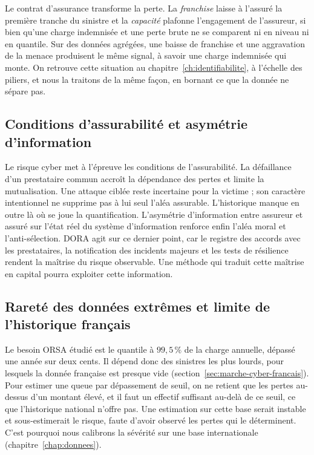 Le contrat d'assurance transforme la perte. La \emph{franchise} laisse à l'assuré la première
tranche du sinistre et la \emph{capacité} plafonne l'engagement de l'assureur, si bien qu'une
charge indemnisée et une perte brute ne se comparent ni en niveau ni en quantile. Sur des données
agrégées, une baisse de franchise et une aggravation de la menace produisent le même signal, à
savoir une charge indemnisée qui monte. On retrouve cette situation au
chapitre~\ref{ch:identifiabilite}, à l'échelle des piliers, et nous la traitons de la
même façon, en bornant ce que la donnée ne sépare pas.

\subsection{Conditions d'assurabilité et asymétrie d'information}
\label{subsec:dependance-accumulation}

Le risque cyber met à l'épreuve les conditions de l'assurabilité. La défaillance d'un prestataire commun accroît la dépendance des pertes et limite la mutualisation. Une attaque ciblée reste incertaine pour la victime ; son caractère intentionnel ne supprime pas à lui seul l'aléa assurable. L'historique
manque en outre là où se joue la quantification. L'asymétrie d'information entre assureur et assuré sur
l'état réel du système d'information renforce enfin l'aléa moral et l'anti-sélection. DORA agit sur
ce dernier point, car le registre des accords avec les prestataires, la notification des incidents
majeurs et les tests de résilience rendent la maîtrise du risque observable. Une méthode qui traduit
cette maîtrise en capital pourra exploiter cette information.

\subsection{Rareté des données extrêmes et limite de l'historique français}
\label{subsec:donnees-extremes}

Le besoin ORSA étudié est le quantile à $99{,}5\,\%$ de la charge annuelle, dépassé une année
sur deux cents. Il dépend donc des sinistres les plus lourds, pour lesquels la donnée française est
presque vide (section~\ref{sec:marche-cyber-francais}). Pour estimer une queue par dépassement de
seuil, on ne retient que les pertes au-dessus d'un montant élevé, et il faut un effectif suffisant
au-delà de ce seuil, ce que l'historique national n'offre pas. Une estimation sur cette base serait
instable et sous-estimerait le risque, faute d'avoir observé les pertes qui le déterminent. C'est
pourquoi nous calibrons la sévérité sur une base internationale (chapitre~\ref{chap:donnees}).

